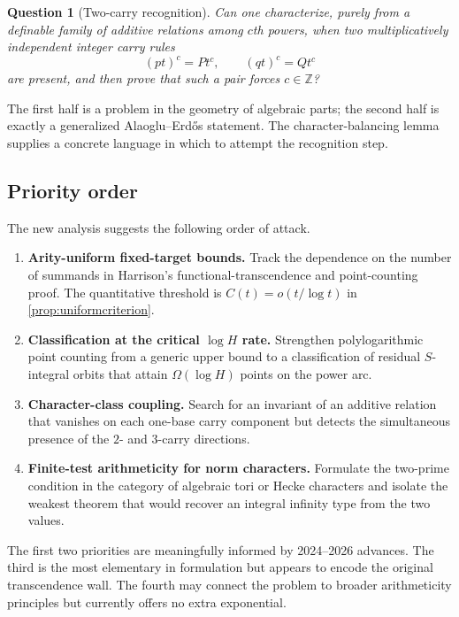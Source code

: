 \documentclass[11pt,oneside]{article}
\newtheorem{question}[theorem]{Question}
\theoremstyle{definition}
\newcommand{\Z}{\mathbb{Z}}
\begin{document}
\begin{question}[Two-carry recognition]\label{q:twocarryrecognition}
Can one characterize, purely from a definable family of additive relations among $c$th powers, when two multiplicatively independent integer carry rules
\[
       (pt)^c=P t^c,
       \qquad (qt)^c=Q t^c
\]
are present, and then prove that such a pair forces $c\in\Z$?
\end{question}

The first half is a problem in the geometry of algebraic parts; the second half is exactly a generalized Alaoglu--Erd\H{o}s statement.  The character-balancing lemma supplies a concrete language in which to attempt the recognition step.

\subsection{Priority order}

The new analysis suggests the following order of attack.

\begin{enumerate}
\item \textbf{Arity-uniform fixed-target bounds.}  Track the dependence on the number of summands in Harrison's functional-transcendence and point-counting proof.  The quantitative threshold is $C(t)=o(t/\log t)$ in \cref{prop:uniformcriterion}.
\item \textbf{Classification at the critical $\log H$ rate.}  Strengthen polylogarithmic point counting from a generic upper bound to a classification of residual $S$-integral orbits that attain $\Omega(\log H)$ points on the power arc.
\item \textbf{Character-class coupling.}  Search for an invariant of an additive relation that vanishes on each one-base carry component but detects the simultaneous presence of the $2$- and $3$-carry directions.
\item \textbf{Finite-test arithmeticity for norm characters.}  Formulate the two-prime condition in the category of algebraic tori or Hecke characters and isolate the weakest theorem that would recover an integral infinity type from the two values.
\end{enumerate}

The first two priorities are meaningfully informed by 2024--2026 advances.  The third is the most elementary in formulation but appears to encode the original transcendence wall.  The fourth may connect the problem to broader arithmeticity principles but currently offers no extra exponential.
\end{document}
